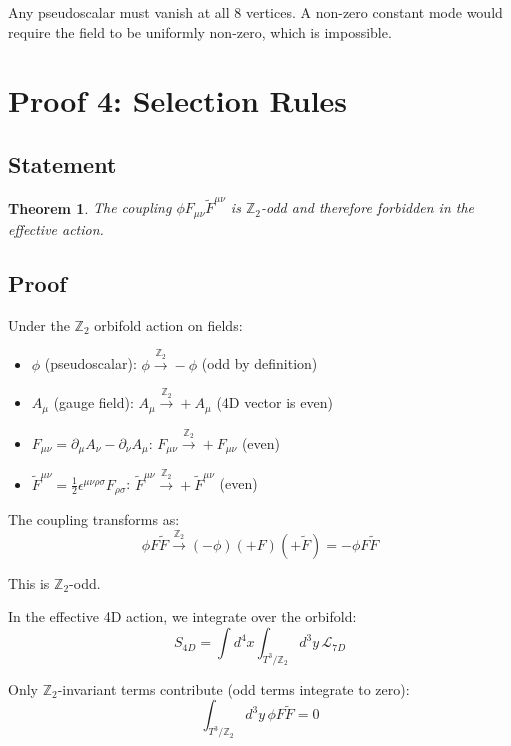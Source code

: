 \documentclass[12pt,a4paper]{article}
\newtheorem{theorem}{Theorem}
\begin{document}
Any pseudoscalar must vanish at all 8 vertices. A non-zero constant mode would require the field to be uniformly non-zero, which is impossible.

\section{Proof 4: Selection Rules}

\subsection{Statement}

\begin{theorem}
The coupling $\phi F_{\mu\nu} \tilde{F}^{\mu\nu}$ is $\mathbb{Z}_2$-odd and therefore forbidden in the effective action.
\end{theorem}

\subsection{Proof}

Under the $\mathbb{Z}_2$ orbifold action on fields:
\begin{itemize}
    \item $\phi$ (pseudoscalar): $\phi \xrightarrow{\mathbb{Z}_2} -\phi$ (odd by definition)
    \item $A_\mu$ (gauge field): $A_\mu \xrightarrow{\mathbb{Z}_2} +A_\mu$ (4D vector is even)
    \item $F_{\mu\nu} = \partial_\mu A_\nu - \partial_\nu A_\mu$: $F_{\mu\nu} \xrightarrow{\mathbb{Z}_2} +F_{\mu\nu}$ (even)
    \item $\tilde{F}^{\mu\nu} = \frac{1}{2}\epsilon^{\mu\nu\rho\sigma}F_{\rho\sigma}$: $\tilde{F}^{\mu\nu} \xrightarrow{\mathbb{Z}_2} +\tilde{F}^{\mu\nu}$ (even)
\end{itemize}

The coupling transforms as:
\begin{equation}
\phi F\tilde{F} \xrightarrow{\mathbb{Z}_2} (-\phi)(+F)(+\tilde{F}) = -\phi F\tilde{F}
\end{equation}

This is $\mathbb{Z}_2$-odd.

In the effective 4D action, we integrate over the orbifold:
\begin{equation}
S_{4D} = \int d^4x \int_{T^3/\mathbb{Z}_2} d^3y \, \mathcal{L}_{7D}
\end{equation}

Only $\mathbb{Z}_2$-invariant terms contribute (odd terms integrate to zero):
\begin{equation}
\int_{T^3/\mathbb{Z}_2} d^3y \, \phi F\tilde{F} = 0
\end{equation}
\end{document}
